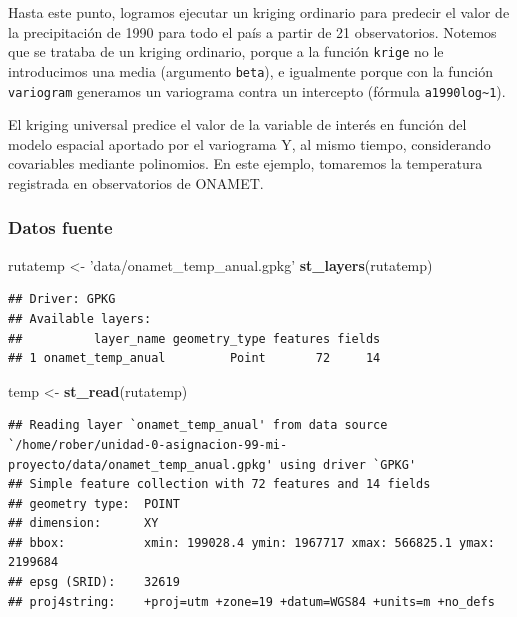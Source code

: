\documentclass[11pt,]{article}
\newenvironment{Shaded}{\begin{snugshade}}{\end{snugshade}}
\newcommand{\KeywordTok}[1]{\textcolor[rgb]{0.13,0.29,0.53}{\textbf{#1}}}
\newcommand{\StringTok}[1]{\textcolor[rgb]{0.31,0.60,0.02}{#1}}
\newcommand{\NormalTok}[1]{#1}
\begin{document}
Hasta este punto, logramos ejecutar un kriging ordinario para predecir
el valor de la precipitación de 1990 para todo el país a partir de 21
observatorios. Notemos que se trataba de un kriging ordinario, porque a
la función \texttt{krige} no le introducimos una media (argumento
\texttt{beta}), e igualmente porque con la función \texttt{variogram}
generamos un variograma contra un intercepto (fórmula
\texttt{a1990log\textasciitilde{}1}).

El kriging universal predice el valor de la variable de interés en
función del modelo espacial aportado por el variograma Y, al mismo
tiempo, considerando covariables mediante polinomios. En este ejemplo,
tomaremos la temperatura registrada en observatorios de ONAMET.

\subsubsection{Datos fuente}\label{datos-fuente-1}

\begin{Shaded}
\begin{Highlighting}[]
\NormalTok{rutatemp <-}\StringTok{ 'data/onamet_temp_anual.gpkg'}
\KeywordTok{st_layers}\NormalTok{(rutatemp)}
\end{Highlighting}
\end{Shaded}

\begin{verbatim}
## Driver: GPKG 
## Available layers:
##          layer_name geometry_type features fields
## 1 onamet_temp_anual         Point       72     14
\end{verbatim}

\begin{Shaded}
\begin{Highlighting}[]
\NormalTok{temp <-}\StringTok{ }\KeywordTok{st_read}\NormalTok{(rutatemp)}
\end{Highlighting}
\end{Shaded}

\begin{verbatim}
## Reading layer `onamet_temp_anual' from data source `/home/rober/unidad-0-asignacion-99-mi-proyecto/data/onamet_temp_anual.gpkg' using driver `GPKG'
## Simple feature collection with 72 features and 14 fields
## geometry type:  POINT
## dimension:      XY
## bbox:           xmin: 199028.4 ymin: 1967717 xmax: 566825.1 ymax: 2199684
## epsg (SRID):    32619
## proj4string:    +proj=utm +zone=19 +datum=WGS84 +units=m +no_defs
\end{verbatim}
\end{document}
